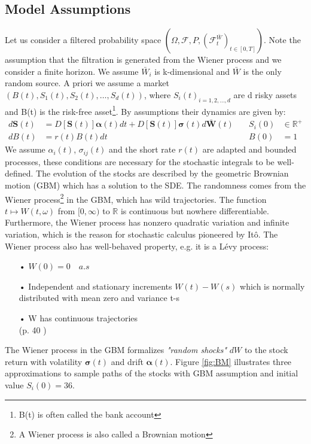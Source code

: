 \subsection{Model Assumptions}
Let us consider a filtered probability space $(\Omega, \mathcal{F}, P, (\mathcal{F}_t^{\bar{W}})_{t \in [0,T]})$. Note the assumption that the filtration is generated from the Wiener process and we consider a finite horizon. We assume $\bar{W}_i$ is k-dimensional and $\bar{W}$ is the only random source. A priori we assume a market $(B(t),S_1(t), S_2(t),\ldots, S_d(t))$, where ${S_i(t)}_{i=1,2,\ldots,d}$ are d risky assets and B(t) is the risk-free asset\footnote{B(t) is often called the bank account}. By assumptions their dynamics are given by:\\
\begin{align}
d\bm{S}(t)&=D[\bm{S}(t)]\bm{\alpha}(t)dt+D[\bm{S}(t)]\bm{\sigma}(t)d\bar{\bm{W}}(t) \quad & S_i(0) &\in \mathbb{R}^+ \label{GBM-P} \\
dB(t)&=r(t)B(t)dt \quad & B(0) &= 1
\end{align}
We assume $\alpha_i(t)$, $\sigma_{ij}(t)$ and the short rate $r(t)$ are adapted and bounded processes, these conditions are necessary for the stochastic integrals to be well-defined. The evolution of the stocks are described by the geometric Brownian motion (GBM) which has a solution to the SDE. The randomness comes from the Wiener process\footnote{A Wiener process is also called a Brownian motion} in the GBM, which has wild trajectories. The function $t\mapsto W(t,\omega)$ from $[0,\infty)$ to $\mathbb{R}$ is continuous but nowhere differentiable. Furthermore, the Wiener process has nonzero quadratic variation and infinite variation, which is the reason for stochastic calculus pioneered by Itô. The Wiener process also has well-behaved property, e.g. it is a Lévy process:
\begin{enumerate}
\item[•] $W(0)=0 \quad a.s$
\item[•] Independent and stationary increments $W(t)-W(s)$ which is normally distributed with mean zero and variance t-s
\item[•] W has continuous trajectories\\
\null \hfill (p. 40 \parencite{finKont})
\end{enumerate}
The Wiener process in the GBM formalizes \textsl{"random shocks"} $dW$ to the stock return with volatility $\bm{\sigma}(t)$ and drift $\bm{\alpha}(t)$. Figure \ref{fig:BM} illustrates three approximations to sample paths of the stocks with GBM assumption and initial value $S_{i}(0)=36$.\\

